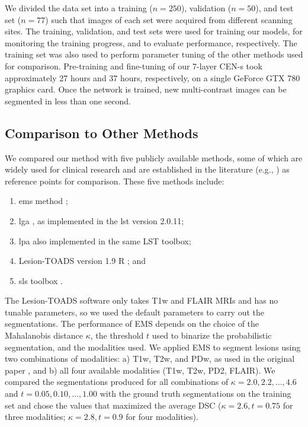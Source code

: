 We divided the data set into a training ($n=250$), validation ($n=50$), and test
set ($n=77$) such that images of each set were acquired from different scanning
sites. The training, validation, and test sets were used for training our
models, for monitoring the training progress, and to evaluate performance,
respectively. The training set was also used to perform parameter tuning of the
other methods used for comparison. Pre-training and fine-tuning of our 7-layer
CEN-s took approximately 27 hours and 37 hours, respectively, on a single
GeForce GTX 780 graphics card. Once the network is trained, new multi-contrast
images can be segmented in less than one second.

\subsection[Comparison to other methods]{Comparison to Other Methods}
\label{sec:othermethods}

We compared our method with five publicly available methods, some of which
are widely used for clinical research and are established in the literature
(e.g., \citealp{sudre2015,subbanna2015,guizard2015}) as reference points for
comparison. These five methods include:
\begin{enumerate}
\item \Gls{ems} method \citep{vanleemput2001};
\item \Gls{lga} \citep{schmidt2012automated}, as
implemented in the \gls{lst} version 2.0.11;
\item \Gls{lpa} also implemented in the same LST toolbox;
\item Lesion-TOADS version 1.9 R \citep{shiee2010topology}; and 
\item \Gls{sls} toolbox \citep{roura2015}.
\end{enumerate}
The Lesion-TOADS software only takes T1w and FLAIR MRIs and has no tunable
parameters, so we used the default parameters to carry out the segmentations.
The performance of EMS depends on the choice of the Mahalanobis distance
$\kappa$, the threshold $t$ used to binarize the probabilistic segmentation, and
the modalities used. We applied EMS to segment lesions using two combinations of
modalities: a) T1w, T2w, and PDw, as used in the original paper
\citep{vanleemput2001}, and b) all four available modalities (T1w, T2w, PD2,
FLAIR). We compared the segmentations produced for all combinations of $\kappa =
2.0, 2.2, \dotsc, 4.6$ and $t = 0.05, 0.10, \dotsc, 1.00$ with the ground truth
segmentations on the training set and chose the values that maximized the
average DSC ($\kappa = 2.6, t = 0.75$ for three modalities; $\kappa = 2.8, t =
0.9$ for four modalities).

